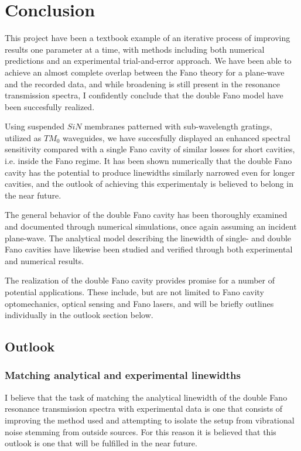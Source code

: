 \section{Conclusion}

This project have been a textbook example of an iterative process of improving results one parameter at a time, with methods including both numerical predictions and an experimental trial-and-error approach. We have been able to achieve an almost complete overlap between the Fano theory for a plane-wave and the recorded data, and while broadening is still present in the resonance transmission spectra, I confidently conclude that the double Fano model have been succesfully realized. 

Using suspended $SiN$ membranes patterned with sub-wavelength gratings, utilized as $TM_0$ waveguides, we have succesfully displayed an enhanced spectral sensitivity compared with a single Fano cavity of similar losses for short cavities, i.e. inside the Fano regime. It has been shown numerically that the double Fano cavity has the potential to produce linewidths similarly narrowed even for longer cavities, and the outlook of achieving this experimentaly is believed to belong in the near future. 

The general behavior of the double Fano cavity has been thoroughly examined and documented through numerical simulations, once again assuming an incident plane-wave. The analytical model describing the linewidth of single- and double Fano cavities have likewise been studied and verified through both experimental and numerical results. 

The realization of the double Fano cavity provides promise for a number of potential applications. These include, but are not limited to Fano cavity optomechanics, optical sensing and Fano lasers, and will be briefly outlines individually in the outlook section  below. 

\subsection{Outlook}

\subsubsection{Matching analytical and experimental linewidths}

I believe that the task of matching the analytical linewidth of the double Fano resonance transmission spectra with experimental data is one that consists of improving the method used and attempting to isolate the setup from vibrational noise stemming from outside sources. For this reason it is believed that this outlook is one that will be fulfilled in the near future. 


